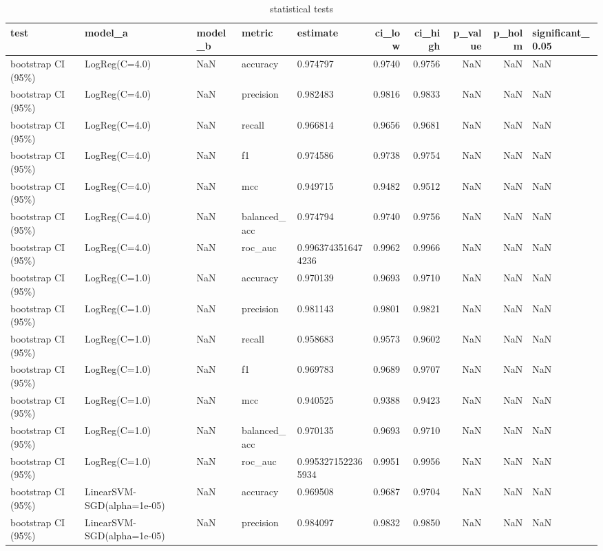 \begin{table}[htbp]
\caption{statistical tests}
\label{tab:statistical_tests}
\begin{tabular}{lllllrrrrl}
\toprule
test & model_a & model_b & metric & estimate & ci_low & ci_high & p_value & p_holm & significant_0.05 \\
\midrule
bootstrap CI (95\%) & LogReg(C=4.0) & NaN & accuracy & 0.974797 & 0.9740 & 0.9756 & NaN & NaN & NaN \\
bootstrap CI (95\%) & LogReg(C=4.0) & NaN & precision & 0.982483 & 0.9816 & 0.9833 & NaN & NaN & NaN \\
bootstrap CI (95\%) & LogReg(C=4.0) & NaN & recall & 0.966814 & 0.9656 & 0.9681 & NaN & NaN & NaN \\
bootstrap CI (95\%) & LogReg(C=4.0) & NaN & f1 & 0.974586 & 0.9738 & 0.9754 & NaN & NaN & NaN \\
bootstrap CI (95\%) & LogReg(C=4.0) & NaN & mcc & 0.949715 & 0.9482 & 0.9512 & NaN & NaN & NaN \\
bootstrap CI (95\%) & LogReg(C=4.0) & NaN & balanced\_acc & 0.974794 & 0.9740 & 0.9756 & NaN & NaN & NaN \\
bootstrap CI (95\%) & LogReg(C=4.0) & NaN & roc\_auc & 0.9963743516474236 & 0.9962 & 0.9966 & NaN & NaN & NaN \\
bootstrap CI (95\%) & LogReg(C=1.0) & NaN & accuracy & 0.970139 & 0.9693 & 0.9710 & NaN & NaN & NaN \\
bootstrap CI (95\%) & LogReg(C=1.0) & NaN & precision & 0.981143 & 0.9801 & 0.9821 & NaN & NaN & NaN \\
bootstrap CI (95\%) & LogReg(C=1.0) & NaN & recall & 0.958683 & 0.9573 & 0.9602 & NaN & NaN & NaN \\
bootstrap CI (95\%) & LogReg(C=1.0) & NaN & f1 & 0.969783 & 0.9689 & 0.9707 & NaN & NaN & NaN \\
bootstrap CI (95\%) & LogReg(C=1.0) & NaN & mcc & 0.940525 & 0.9388 & 0.9423 & NaN & NaN & NaN \\
bootstrap CI (95\%) & LogReg(C=1.0) & NaN & balanced\_acc & 0.970135 & 0.9693 & 0.9710 & NaN & NaN & NaN \\
bootstrap CI (95\%) & LogReg(C=1.0) & NaN & roc\_auc & 0.9953271522365934 & 0.9951 & 0.9956 & NaN & NaN & NaN \\
bootstrap CI (95\%) & LinearSVM-SGD(alpha=1e-05) & NaN & accuracy & 0.969508 & 0.9687 & 0.9704 & NaN & NaN & NaN \\
bootstrap CI (95\%) & LinearSVM-SGD(alpha=1e-05) & NaN & precision & 0.984097 & 0.9832 & 0.9850 & NaN & NaN & NaN \\

\end{tabular}
\end{table}
